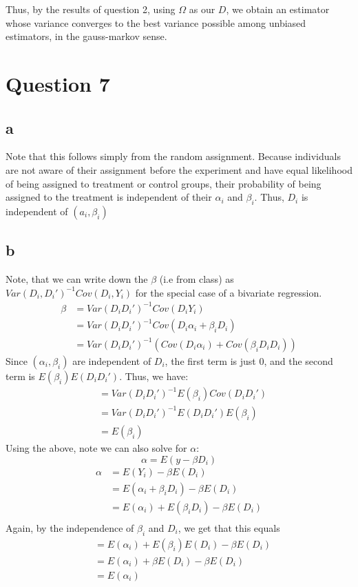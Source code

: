 \documentclass[12pt]{paper}
\begin{document}
Thus, by the results of question 2, using $\Omega$ as our $D$, we obtain an estimator whose variance converges to the best variance possible among unbiased estimators, in the gauss-markov sense.


\section*{Question 7}
\subsection*{a}
Note that this follows simply from the random assignment. Because individuals are not aware of their assignment before the experiment and have equal likelihood of being assigned to treatment or control groups, their probability of being assigned to the treatment is independent of their $\alpha_i$ and $\beta_i$. Thus, $D_i$ is independent of $(a_i,\beta_i)$
\subsection*{b}
Note, that we can write down the $\beta$ (i.e from class) as $Var(D_i,D_i')^{-1}Cov(D_i,Y_i)$ for the special case of a bivariate regression. 
\begin{align*}
    \beta &= Var(D_iD_i')^{-1}Cov(D_iY_i) \\
    &= Var(D_iD_i')^{-1}Cov(D_i\alpha_i + \beta_i D_i) \\
    &= Var(D_iD_i')^{-1}(Cov(D_i\alpha_i) + Cov(\beta_i D_iD_i)) 
\end{align*}
Since $(\alpha_i,\beta_i)$ are independent of $D_i$, the first term is just 0, and the second term is $E(\beta_i)E(D_iD_i')$. Thus, we have:
\begin{align*}
    & = Var(D_iD_i')^{-1} E(\beta_i)Cov(D_iD_i') \\
    & = Var(D_iD_i')^{-1} E(D_iD_i')E(\beta_i)\\
    & = E(\beta_i)
\end{align*}
Using the above, note we can also solve for $\alpha$:
$$ \alpha = E(y-\beta D_i)$$
\begin{align*}
    \alpha & = E(Y_i) - \beta E(D_i) \\
    & = E(\alpha_i + \beta_i D_i) - \beta E(D_i) \\
    & = E(\alpha_i) + E(\beta_i D_i) - \beta E(D_i) \\
\end{align*}
Again, by the independence of $\beta_i$ and $D_i$, we get that this equals
\begin{align*}
    & = E(\alpha_i) + E(\beta_i) E(D_i) - \beta E(D_i) \\
    & = E(\alpha_i) + \beta E( D_i) - \beta E(D_i) \\
    & = E(\alpha_i)  \\
\end{align*}
\end{document}
